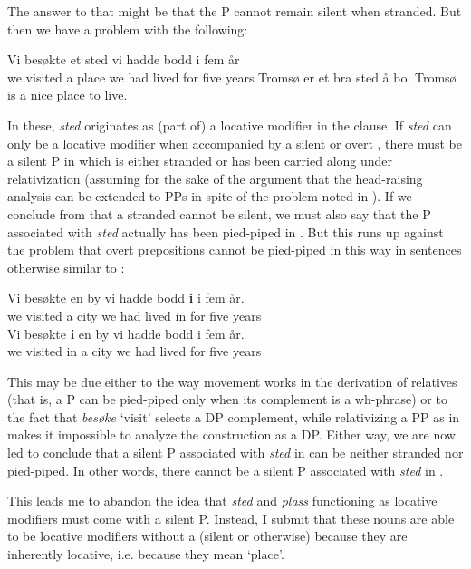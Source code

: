 \documentclass[output=paper]{LSP/langsci}
\begin{document}
The answer to that might be that the P cannot remain silent when stranded. But then we have a problem with the following:

\ea%
    \label{ex:taraldsen:36}
\ea
 Vi besøkte et sted vi hadde bodd i fem år\\
 \glt        we visited  a place we had lived for five years
\ex Tromsø er et bra sted å bo.
\glt         Tromsø is a nice place to live.
\z
\z

In these, \textit{sted} originates as (part of) a locative modifier in the  clause. If \textit{sted} can only be a locative modifier when accompanied by a silent or overt , there must be a silent P in  which is either stranded or has been carried along under relativization (assuming for the sake of the argument that the head-raising analysis can be extended to PPs in spite of the problem noted in ). If we conclude from  that a stranded  cannot be silent, we must also say that the P associated with \textit{sted} actually has been pied-piped in . But this runs up against the problem that overt prepositions cannot be pied-piped in this way in sentences otherwise similar to :

\ea%
    \label{ex:taraldsen:37}
\ea \label{ex:taraldsen:37a}
\gll Vi besøkte en by vi hadde bodd \textbf{i} i fem år.\\
           we visited a city we had   lived in for five years\\

\ex \label{ex:taraldsen:37b}
\gll *Vi besøkte \textbf{i} en by vi hadde bodd i fem år.\\
          we visited in a city we had  lived for five years\\
\z
\z

This may be due either to the way movement works in the derivation of relatives (that is, a P can be pied-piped only when its complement is a wh-phrase) or to the fact that \textit{besøke} `visit' selects a DP complement, while relativizing a PP as in  makes it impossible to analyze the  construction as a DP. Either way, we are now led to conclude that a silent P associated with \textit{sted} in  can be neither stranded nor pied-piped. In other words, there cannot be a silent P associated with \textit{sted} in .

This leads me to abandon the idea that \textit{sted} and \textit{plass} functioning as locative modifiers must come with a silent P. Instead, I submit that these nouns are able to be locative modifiers without a  (silent or otherwise) because they are inherently locative, i.e. because they mean `place'.
\end{document}
